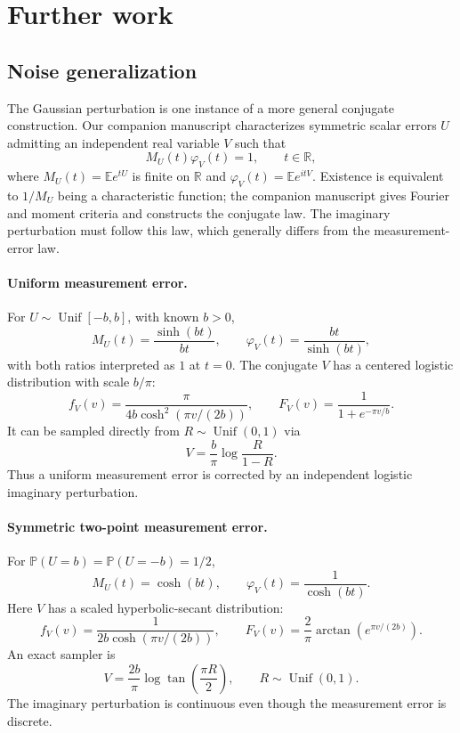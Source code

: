 \section{Further work}
\label{sec:future_work}

\subsection{Noise generalization}
\label{sec:noise_generalization}
The Gaussian perturbation is one instance of a more general conjugate
construction. Our companion manuscript \cite{conjugatecriterion2026}
characterizes symmetric scalar errors $U$ admitting an independent real
variable $V$ such that
\begin{equation}\label{eq:conjugate_transform}
M_U(t)\varphi_V(t)=1,\qquad t\in\mathbb R,
\end{equation}
where $M_U(t)=\mathbb E e^{tU}$ is finite on $\mathbb R$ and
$\varphi_V(t)=\mathbb E e^{itV}$. Existence is equivalent to $1/M_U$
being a characteristic function; the companion manuscript gives Fourier
and moment criteria and constructs the conjugate law. The imaginary
perturbation must follow this law, which generally differs from the
measurement-error law.

\paragraph{Uniform measurement error.}
For $U\sim\operatorname{Unif}[-b,b]$, with known $b>0$,
\[
M_U(t)=\frac{\sinh(bt)}{bt},\qquad
\varphi_V(t)=\frac{bt}{\sinh(bt)},
\]
with both ratios interpreted as $1$ at $t=0$.
The conjugate $V$ has a centered logistic distribution with scale $b/\pi$:
\[
f_V(v)=\frac{\pi}{4b\cosh^2(\pi v/(2b))},\qquad
F_V(v)=\frac{1}{1+e^{-\pi v/b}}.
\]
It can be sampled directly from $R\sim\operatorname{Unif}(0,1)$ via
\begin{equation}\label{eq:uniform_conjugate_sampler}
V=\frac b\pi\log\frac{R}{1-R}.
\end{equation}
Thus a uniform measurement error is corrected by an independent logistic
imaginary perturbation.

\paragraph{Symmetric two-point measurement error.}
For $\mathbb P(U=b)=\mathbb P(U=-b)=1/2$,
\[
M_U(t)=\cosh(bt),\qquad
\varphi_V(t)=\frac1{\cosh(bt)}.
\]
Here $V$ has a scaled hyperbolic-secant distribution:
\[
f_V(v)=\frac{1}{2b\cosh(\pi v/(2b))},\qquad
F_V(v)=\frac2\pi\arctan\!\left(e^{\pi v/(2b)}\right).
\]
An exact sampler is
\begin{equation}\label{eq:binary_conjugate_sampler}
V=\frac{2b}\pi\log\tan\!\left(\frac{\pi R}{2}\right),
\qquad R\sim\operatorname{Unif}(0,1).
\end{equation}
The imaginary perturbation is continuous even though the measurement
error is discrete.


